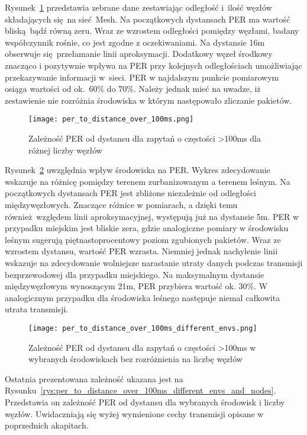 Rysunek~\ref{rys:per_to_distance_over_100ms} przedstawia zebrane dane zestawiając odległość i~ilość węzłów składających
się na sieć Mesh. Na początkowych dystansach PER ma wartość bliską bądź równą zeru. Wraz ze wzrostem odległości pomiędzy
węzłami, badany współczynnik rośnie, co jest zgodne z oczekiwaniami. Na dystansie 16m obserwuje się przełamanie
linii aproksymacji. Dodatkowy węzeł środkowy znacząco i pozytywnie wpływa na PER przy kolejnych odległościach
umożliwiając przekazywanie informacji w~sieci. PER w najdalszym punkcie pomiarowym osiąga wartości od ok.~60\% do 70\%.
Należy jednak mieć na uwadze, iż zestawienie nie rozróżnia środowiska w którym następowało zliczanie pakietów.


\begin{figure}[!htb]
	\centering \texttt{[image: per\_to\_distance\_over\_100ms.png]}
	\caption{Zależność \gls{PER} od dystansu dla zapytań o częstości >100ms dla różnej liczby węzłów}
	\label{rys:per_to_distance_over_100ms}
\end{figure}

Rysunek~\ref{rys:per_to_distance_over_100ms_different_envs} uwzględnia wpływ środowiska na PER. Wykres zdecydowanie
wskazuje na różnicę pomiędzy terenem zurbanizowanym a terenem leśnym. Na początkowych dystansach PER jest zbliżone
niezależnie od odległości międzywęzłowych. Znaczące różnice w pomiarach, a dzięki temu również względem linii aproksymacyjnej,
występują już na dystansie 5m. PER w przypadku miejskim jest bliskie zera, gdzie analogiczne pomiary w środowisku
leśnym sugerują piętnastoprocentowy poziom zgubionych pakietów. Wraz ze wzrostem dystansu, wartość PER wzrasta.
Niemniej jednak nachylenie linii wskazuje na zdecydowanie wolniejsze narastanie utraty danych podczas transmisji
bezprzewodowej dla przypadku miejskiego. Na maksymalnym dystansie międzywęzłowym wynoszącym 21m, PER
przybiera wartość ok. 30\%. W analogicznym przypadku dla środowiska leśnego następuje niemal całkowita utrata
transmisji.

\begin{figure}[!htb]
	\centering \texttt{[image: per\_to\_distance\_over\_100ms\_different\_envs.png]} 
	\caption{Zależność \gls{PER} od dystansu dla zapytań o częstości >100ms w wybranych środowiskach bez rozróżnienia na liczbę węzłów}
	\label{rys:per_to_distance_over_100ms_different_envs}
\end{figure}

Ostatnia prezentowana zależność ukazana jest na Rysunku~\ref{rys:per_to_distance_over_100ms_different_envs_and_nodes}.
Przedstawia on zależność PER od dystansu dla wybranych środowisk i liczby węzłów. Uwidaczniają się wyżej wymienione
cechy transmisji opisane w poprzednich akapitach.


